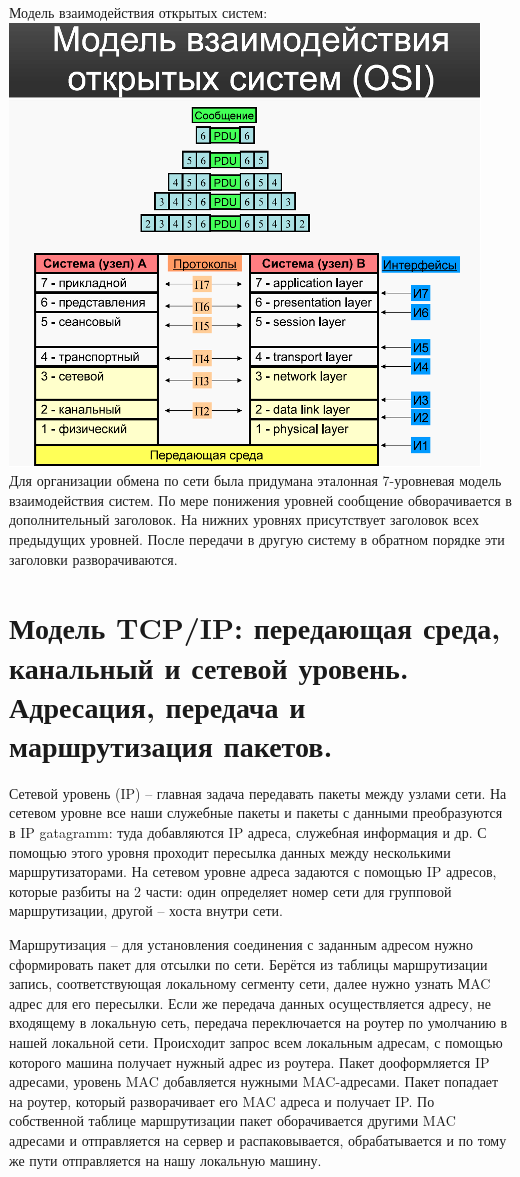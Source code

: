 \documentclass{article}
\begin{document}
Модель взаимодействия открытых систем:
\\
\includegraphics[width=.8\textwidth]{osi.png}\\
Для организации обмена по сети была придумана эталонная 7-уровневая модель взаимодействия систем. 
По мере понижения уровней сообщение обворачивается в дополнительный заголовок. 
На нижних уровнях присутствует заголовок всех предыдущих уровней. 
После передачи в другую систему в обратном порядке эти заголовки разворачиваются. 

\section{Модель TCP/IP: передающая среда, канальный и сетевой уровень. Адресация, передача и маршрутизация пакетов.}

Сетевой уровень (IP) – главная задача передавать пакеты между узлами сети. На сетевом уровне все наши служебные пакеты и пакеты с данными преобразуются в IP gatagramm: 
туда добавляются IP адреса, служебная информация и др. С помощью этого уровня проходит пересылка данных между несколькими маршрутизаторами. 
На сетевом уровне адреса задаются с помощью IP адресов, которые разбиты на 2 части: один определяет номер сети для групповой маршрутизации, 
другой – хоста внутри сети.

Маршрутизация – для установления соединения с заданным адресом нужно сформировать пакет для отсылки по сети. 
Берётся из таблицы маршрутизации запись, соответствующая локальному сегменту сети, далее нужно узнать МAC адрес для его пересылки. 
Если же передача данных осуществляется адресу, не входящему в локальную сеть, передача переключается на роутер по умолчанию в нашей локальной сети. 
Происходит запрос всем локальным адресам, с помощью которого машина получает нужный адрес из роутера. 
Пакет дооформляется IP адресами, уровень MAC добавляется нужными MAC-адресами. Пакет попадает на роутер, который разворачивает его MAC адреса и получает IP. 
По собственной таблице маршрутизации пакет оборачивается другими MAC адресами и отправляется на сервер и распаковывается, обрабатывается и по тому же пути отправляется на нашу локальную машину. 
\end{document}
